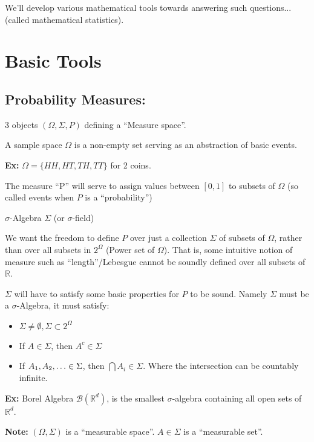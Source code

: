 \documentclass[twoside]{article}
\begin{document}
We'll develop various mathematical tools towards answering such questions... (called mathematical statistics).

\section{Basic Tools}

\subsection{Probability Measures:}
3 objects $(\Omega, \Sigma, P)$ defining a ``Measure space''.

\begin{definition}
  A sample space $\Omega$ is a non-empty set serving as an abstraction of basic events.

  \textbf{Ex: } $\Omega = \{ HH, HT, TH, TT \}$ for 2 coins.

  The measure ``P'' will serve to assign values between $[0,1]$ to subsets of $\Omega$ (so called events when $P$ is a ``probability'')
\end{definition}

\begin{definition}
  $\sigma$-Algebra $\Sigma$ (or $\sigma$-field)

  We want the freedom to define $P$ over just a collection $\Sigma$ of subsets of $\Omega$, rather than over all subsets in $2^\Omega$ (Power set of $\Omega$). That is, some intuitive notion of measure such as ``length''/Lebesgue cannot be soundly defined over all subsets of $\mathbb{R}$.

  $\Sigma$ will have to satisfy some basic properties for $P$ to be sound. Namely $\Sigma$ must be a $\sigma$-Algebra, it must satisfy:
  \begin{itemize}
    \item $\Sigma \neq \emptyset, \Sigma \subset 2^\Omega$
    \item If $A \in \Sigma$, then $A^c \in \Sigma$
    \item If $A_1, A_2,\mathellipsis \in \Sigma$, then $\bigcap A_i \in \Sigma $. Where the intersection can be countably infinite.
  \end{itemize}

  \textbf{Ex: } Borel Algebra $\mathcal{B}(\mathbb{R}^d)$, is the smallest $\sigma$-algebra containing all open sets of $\mathbb{R}^d$.
\end{definition}

\textbf{Note:} $(\Omega, \Sigma)$ is a ``measurable space''. $A \in \Sigma$ is a ``measurable set''.
\end{document}
